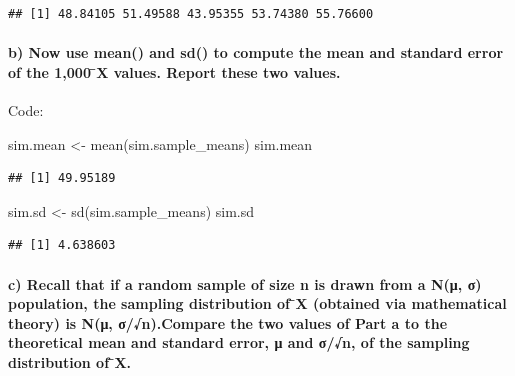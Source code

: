\documentclass[
]{article}
\newenvironment{Shaded}{\begin{snugshade}}{\end{snugshade}}
\newcommand{\FunctionTok}[1]{\textcolor[rgb]{0.00,0.00,0.00}{#1}}
\newcommand{\NormalTok}[1]{#1}
\newcommand{\OtherTok}[1]{\textcolor[rgb]{0.56,0.35,0.01}{#1}}
\begin{document}
\begin{verbatim}
## [1] 48.84105 51.49588 43.95355 53.74380 55.76600
\end{verbatim}

\hypertarget{b-now-use-mean-and-sd-to-compute-the-mean-and-standard-error-of-the-1000-x-values.-report-these-two-values.}{%
\paragraph{b) Now use mean() and sd() to compute the mean and standard
error of the 1,000 ̄X values. Report these two
values.}\label{b-now-use-mean-and-sd-to-compute-the-mean-and-standard-error-of-the-1000-x-values.-report-these-two-values.}}

Code:

\begin{Shaded}
\begin{Highlighting}[]
\NormalTok{sim.mean }\OtherTok{\textless{}{-}} \FunctionTok{mean}\NormalTok{(sim.sample\_means)}
\NormalTok{sim.mean}
\end{Highlighting}
\end{Shaded}

\begin{verbatim}
## [1] 49.95189
\end{verbatim}

\begin{Shaded}
\begin{Highlighting}[]
\NormalTok{sim.sd }\OtherTok{\textless{}{-}} \FunctionTok{sd}\NormalTok{(sim.sample\_means)}
\NormalTok{sim.sd}
\end{Highlighting}
\end{Shaded}

\begin{verbatim}
## [1] 4.638603
\end{verbatim}

\newpage

\hypertarget{c-recall-that-if-a-random-sample-of-size-n-is-drawn-from-a-nux3bc-ux3c3-population-the-sampling-distribution-of-x-obtained-via-mathematical-theory-is-nux3bc-ux3c3n.compare-the-two-values-of-part-a-to-the-theoretical-mean-and-standard-error-ux3bc-and-ux3c3n-of-the-sampling-distribution-of-x.}{%
\paragraph{c) Recall that if a random sample of size n is drawn from a
N(μ, σ) population, the sampling distribution of ̄X (obtained via
mathematical theory) is N(μ, σ/√n).Compare the two values of Part a to
the theoretical mean and standard error, μ and σ/√n, of the sampling
distribution of
̄X.}\label{c-recall-that-if-a-random-sample-of-size-n-is-drawn-from-a-nux3bc-ux3c3-population-the-sampling-distribution-of-x-obtained-via-mathematical-theory-is-nux3bc-ux3c3n.compare-the-two-values-of-part-a-to-the-theoretical-mean-and-standard-error-ux3bc-and-ux3c3n-of-the-sampling-distribution-of-x.}}
\end{document}
